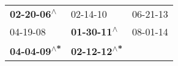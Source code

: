 \begin{supertabular}{lll}
  \textbf{02-20-06\textsuperscript{$\wedge$}} &                    02-14-10\textsuperscript{} &  06-21-13\textsuperscript{} \\
                   04-19-08\textsuperscript{} &   \textbf{01-30-11\textsuperscript{$\wedge$}} &  08-01-14\textsuperscript{} \\
 \textbf{04-04-09\textsuperscript{$\wedge$*}} &  \textbf{02-12-12\textsuperscript{$\wedge$*}} &                             \\
\end{supertabular}
